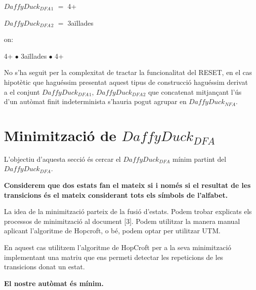 \documentclass[12pt,a4paper]{report}
\def \dfa{$DaffyDuck_{DFA} $}
\def \nfa{$DaffyDuck_{NFA} $}
\begin{document}
\begin{center}
\dfa$_1$ $=$ 4+
\end{center}

\begin{center}
\dfa$_2$ $=$ 3aïllades
\end{center}

on:

\begin{center}
4+ $\bullet$ 3aïllades $\bullet$ 4+
\end{center}

No s’ha seguit per la complexitat de tractar la funcionalitat del RESET, en el cas hipotètic que haguéssim presentat aquest tipus de construcció haguéssim derivat a el conjunt {\dfa$_1$, \dfa$_2$} que concatenat mitjançant l'ús d'un autòmat finit indeterminista s'hauria pogut agrupar en \nfa{}.

\section{Minimització de \dfa{}}

L’objectiu d’aquesta secció és cercar el \dfa{} mínim partint del \dfa{}.

\textbf{Considerem que dos estats fan el mateix si i només si el resultat de les transicions és el mateix considerant tots els símbols de l’alfabet. }

La idea de la minimització parteix de la fusió d'estats. Podem trobar explicats els processos de minimització al document [3]. Podem utilitzar la manera manual aplicant l'algoritme de Hopcroft, o bé, podem optar per utilitzar UTM.

En aquest cas utilitzem l’algoritme de HopCroft per a la seva minimització implementant una matriu que ens permeti detectar les repeticions de les transicions donat un estat.


\begin{center}
\textbf{El nostre autòmat és mínim.}
\end{center}
\end{document}
